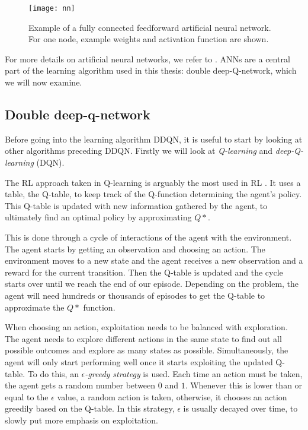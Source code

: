 \begin{figure}[h]
    \centering
    \texttt{[image: nn]}
    \caption{Example of a fully connected feedforward artificial neural network. For one node, example weights and activation function are shown.}
    \label{fig:nn}
\end{figure}

For more details on artificial neural networks, we refer to \cite{nn}. ANNs are a central part of the learning algorithm used in this thesis: double deep-Q-network, which we will now examine.

\subsection{Double deep-q-network}\label{pl-dqn}
Before going into the learning algorithm DDQN, it is useful to start by looking at other algorithms preceding DDQN. Firstly we will look at \emph{Q-learning} and \emph{deep-Q-learning} (DQN). 

The RL approach taken in Q-learning is arguably the most used in RL \cite{qlearning}. It uses a table, the Q-table, to keep track of the Q-function determining the agent's policy. This Q-table is updated with new information gathered by the agent, to ultimately find an optimal policy by approximating $Q*$.

This is done through a cycle of interactions of the agent with the environment. The agent starts by getting an observation and choosing an action. The environment moves to a new state and the agent receives a new observation and a reward for the current transition. Then the Q-table is updated and the cycle starts over until we reach the end of our episode. Depending on the problem, the agent will need hundreds or thousands of episodes to get the Q-table to approximate the $Q*$ function.

When choosing an action, exploitation needs to be balanced with exploration. The agent needs to explore different actions in the same state to find out all possible outcomes and explore as many states as possible. Simultaneously, the agent will only start performing well once it starts exploiting the updated Q-table. To do this, an \emph{$\epsilon$-greedy strategy} is used. Each time an action must be taken, the agent gets a random number between $0$ and $1$. Whenever this is lower than or equal to the $\epsilon$ value, a random action is taken, otherwise, it chooses an action greedily based on the Q-table. In this strategy, $\epsilon$ is usually decayed over time, to slowly put more emphasis on exploitation.


